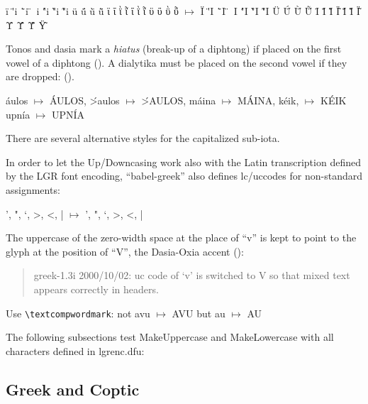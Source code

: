 \documentclass[a4paper]{article}
\begin{document}
\foreignlanguage{greek}{\"i \"'i \"`i \"~i \'"i \`"i \~"i
			\"u \"\'u \"\`u \"\~u
			ϊ ΐ ῒ ῗ ΐ ῒ ῗ ϋ ΰ ῢ ῧ
  $\mapsto$ \MakeUppercase{\"i \"'i \"`i \"~i \'"i \`"i \~"i
    	    		   \"u \"\'u \"\`u \"\~u
			   ϊ ΐ ῒ ῗ ΐ ῒ ῗ ϋ ΰ ῢ ῧ
			   }
}


Tonos and dasia mark a \emph{hiatus} (break-up of a diphtong) if
placed on the first vowel of a diphtong
().
A dialytika must be placed on the second vowel if they are dropped:
().

\'aulos $\mapsto$ \MakeUppercase{\'aulos},
\'>aulos $\mapsto$ \MakeUppercase{\'>aulos},
m\'aina $\mapsto$ \MakeUppercase{m\'aina},
k\'eik, $\mapsto$ \MakeUppercase{k\'eik}
upn\'ia $\mapsto$ \MakeUppercase{upn\'ia}

There are several alternative styles for the capitalized sub-iota.

In order to let the Up/Downcasing work also with the Latin transcription
defined by the LGR font encoding, ``babel-greek'' also defines lc/uccodes
for non-standard assignments:

', ", `, >, <, | $\mapsto$ \MakeUppercase{', ", `, >, <, |}

The uppercase of the zero-width space at the place of ``v'' is kept to point
to the glyph at the position of ``V'', the Dasia-Oxia accent
():

\begin{quotation}
  greek-1.3i 2000/10/02: uc code of `v' is switched to V
  so that mixed text appears correctly in headers.
\end{quotation}

Use \verb+\textcompwordmark+:
not \foreignlanguage{greek}{avu $\mapsto$ \MakeUppercase{avu}} but
\foreignlanguage{greek}{a\textcompwordmark u 
$\mapsto$ \MakeUppercase{a\textcompwordmark u}}

The following subsections test MakeUppercase and MakeLowercase with all
characters defined in lgrenc.dfu:

\subsection{Greek and Coptic}
\end{document}
